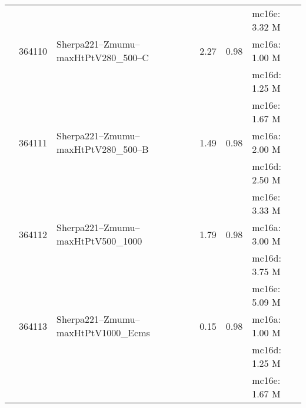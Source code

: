 \begin{center}
{\begin{xtabular}{lclS[round-mode=figures, round-precision=3]S[round-mode=places,  round-precision=2]l}
			& & & & & mc16e: 3.32 M \\
			& 364110 & Sherpa221--Zmumu--maxHtPtV280\_500--C & 2.27 & 0.98 &  mc16a: 1.00 M \\
			& & & & & mc16d: 1.25 M \\
			& & & & & mc16e: 1.67 M \\
			& 364111 & Sherpa221--Zmumu--maxHtPtV280\_500--B & 1.49 & 0.98 &  mc16a: 2.00 M \\
			& & & & & mc16d: 2.50 M \\
			& & & & & mc16e: 3.33 M \\
			& 364112 & Sherpa221--Zmumu--maxHtPtV500\_1000       & 1.79 & 0.98 &  mc16a: 3.00 M \\
			& & & & & mc16d: 3.75 M \\
			& & & & & mc16e: 5.09 M \\
			& 364113 & Sherpa221--Zmumu--maxHtPtV1000\_Ecms     & 0.15 & 0.98 &  mc16a: 1.00 M \\
			& & & & & mc16d: 1.25 M \\
			& & & & & mc16e: 1.67 M \\
			

\end{xtabular}}
\end{center}
